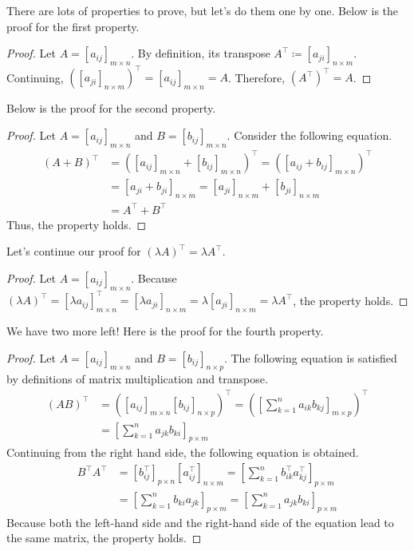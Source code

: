 \documentclass[../../../main.tex]{subfiles}
\begin{document}
There are lots of properties to prove, but let's do them one by one.
Below is the proof for the first property.

\begin{proof}
Let $A = [a_{ij}]_{m \times n}$. By definition, its transpose
$A^\intercal \coloneqq [a_{ji}]_{n \times m}$. Continuing,
$\left( [a_{ji}]_{n \times m} \right)^\intercal =
[a_{ij}]_{m \times n} = A$. Therefore, $(A^\intercal)^\intercal = A$.
\end{proof}

Below is the proof for the second property.

\begin{proof}
Let $A = [a_{ij}]_{m \times n}$ and $B = [b_{ij}]_{m \times n}$.
Consider the following equation.
\begin{align*}
(A + B)^\intercal
&= \left(
    [a_{ij}]_{m \times n} + [b_{ij}]_{m \times n}
\right)^\intercal
= \left(
    [a_{ij} + b_{ij}]_{m \times n}
\right)^\intercal \\
&= [a_{ji} + b_{ji}]_{n \times m}
= [a_{ji}]_{n \times m} + [b_{ji}]_{n \times m} \\
&= A^\intercal + B^\intercal
\end{align*}
Thus, the property holds.
\end{proof}

Let's continue our proof for $(\lambda A)^\intercal =
\lambda A^\intercal$.

\begin{proof}
Let $A = [a_{ij}]_{m \times n}$. Because
$(\lambda A)^\intercal
= [\lambda a_{ij}]_{m \times n}^\intercal
= [\lambda a_{ji}]_{n \times m}
= \lambda [a_{ji}]_{n \times m}
= \lambda A^\intercal$, the property holds.
\end{proof}

We have two more left! Here is the proof for the fourth property.

\begin{proof}
Let $A = [a_{ij}]_{m \times n}$ and $B = [b_{ij}]_{n \times p}$.
The following equation is satisfied by definitions of matrix
multiplication and transpose.
\begin{align*}
    (AB)^\intercal
    &= \left(
        [a_{ij}]_{m \times n} [b_{ij}]_{n \times p}
    \right)^\intercal
    = \left(
        \left[ \sum_{k = 1}^{n} a_{ik} b_{kj} \right]_{m \times p}
    \right)^\intercal \\
    &= \left[ \sum_{k = 1}^{n} a_{jk} b_{ki} \right]_{p \times m}
\end{align*}
Continuing from the right hand side, the following equation is
obtained.
\begin{align*}
    B^\intercal A^\intercal
    &= \left[ b_{ij}^\intercal \right]_{p \times n}
        \left[ a_{ij}^\intercal \right]_{n \times m}
    = \left[
        \sum_{k = 1}^{n} b_{ik}^\intercal a_{kj}^\intercal
    \right]_{p \times m} \\
    &= \left[ \sum_{k = 1}^{n} b_{ki} a_{jk} \right]_{p \times m}
    = \left[ \sum_{k = 1}^{n} a_{jk} b_{ki} \right]_{p \times m}
\end{align*}
Because both the left-hand side and the right-hand side of the
equation lead to the same matrix, the property holds.
\end{proof}
\end{document}
